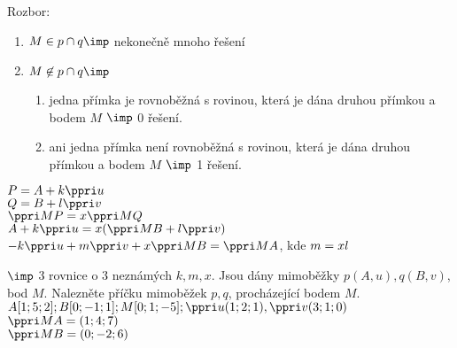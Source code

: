Rozbor:
\begin{enumerate}[1)]
	\item $M \in p\cap q \imp$ nekonečně mnoho řešení
	\item $M \not\in p\cap q \imp$ 
		\begin{enumerate}
			\item jedna přímka je rovnoběžná s rovinou, která je
 dána druhou přímkou a bodem $M$ $\imp$ 0 řešení.
			\item ani jedna přímka není rovnoběžná s rovinou, která je
 dána druhou přímkou a bodem $M$ $\imp$ 1 řešení.
		\end{enumerate}
\end{enumerate}
$P = A + k \ve u$\\
$Q = B + l \ve v$\\
$\ve{MP} = x \* \ve{MQ}$\\
$A + k \ve u = x (\ve{MB} + l \ve v)$\\
$-k\ve u + m \ve v + x \ve{MB} =\ve {MA}$, kde $m = x\* l$

$\imp$ 3 rovnice o 3 neznámých $k,m,x$.
\Pr Jsou dány mimoběžky $p(A,u), q(B, v)$, bod $M$. Nalezněte příčku mimoběžek $p, q$, procházející bodem $M$.\\
$A[1;5;2];B[0;-1;1];M[0;1;-5];\ve u (1;2;1),\ve v(3;1;0)$\\

$\ve{MA} = (1; 4;7)$\\
$\ve{MB} = (0;-2;6)$

